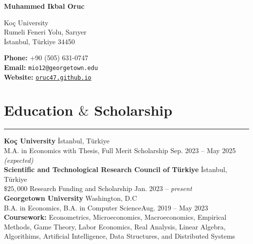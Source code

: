 \documentclass[a4paper,10pt]{article}
\newcommand{\HRule}{\rule{\linewidth}{0.5mm}}
\begin{document}
{\LARGE \textbf{Muhammed Ikbal Oruc}}
\vspace{10pt}

\noindent
\begin{spacing}{2}
    \begin{minipage}[t]{0.5\textwidth} %
        Koç University \\
        Rumeli Feneri Yolu, Sarıyer\\
        İstanbul, Türkiye 34450
    \end{minipage}%
    \begin{minipage}[t]{0.5\textwidth} %
        \raggedleft %
        \textbf{Phone:} +90 (505) 631-0747 \\
        \textbf{Email:} \texttt{mio12@georgetown.edu} \\
        \textbf{Website:} \href{https://oruc47.github.io}{\texttt{oruc47.github.io}}\\
    \end{minipage}
\end{spacing}

\vspace{-10pt}



\section*{Education $\&$ Scholarship}
\vspace{-15pt}
\HRule

\textbf{Koç University} \hfill İstanbul, Türkiye\\
M.A. in Economics with Thesis, Full Merit Scholarship \hfill Sep. 2023 – May 2025 \emph{(expected)}\\[5pt]

\textbf{Scientific and Technological Research Council of Türkiye} \hfill İstanbul, Türkiye\\
$\$25,000$ Research Funding and Scholarship \hfill Jan. 2023 – \emph{present}\\[5pt]


\textbf{Georgetown University} \hfill Washington, D.C \\
B.A. in Economics, B.A. in Computer Science\hfill Aug. 2019 – May 2023 \\[5pt]

\textbf{Coursework:} Econometrics, Microeconomics, 
Macroeconomics, Empirical Methods, Game Theory, Labor Economics,
Real Analysis, Linear Algebra, Algorithims, Artificial 
Intelligence, Data Structures, and Distributed Systems
\end{document}
